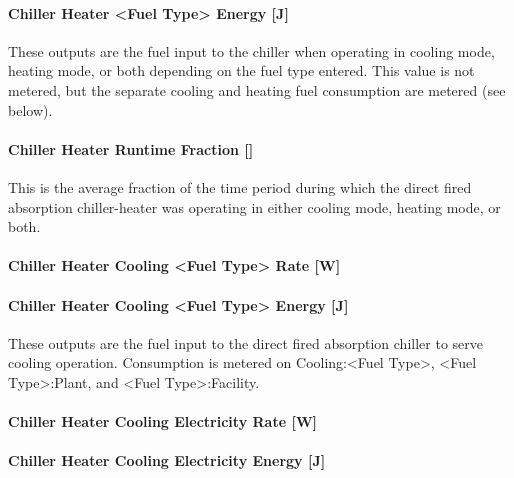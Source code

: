 \paragraph{Chiller Heater \textless{}Fuel Type\textgreater{} Energy {[}J{]}}\label{chiller-heater-fuel-type-energy-j}

These outputs are the fuel input to the chiller when operating in cooling mode, heating mode, or both depending on the fuel type entered. This value is not metered, but the separate cooling and heating fuel consumption are metered (see below).

\paragraph{Chiller Heater Runtime Fraction {[]}}\label{chiller-heater-runtime-fraction}

This is the average fraction of the time period during which the direct fired absorption chiller-heater was operating in either cooling mode, heating mode, or both.

\paragraph{Chiller Heater Cooling \textless{}Fuel Type\textgreater{} Rate {[}W{]}}\label{chiller-heater-cooling-fuel-type-rate-w}

\paragraph{Chiller Heater Cooling \textless{}Fuel Type\textgreater{} Energy {[}J{]}}\label{chiller-heater-cooling-fuel-type-energy-j}

These outputs are the fuel input to the direct fired absorption chiller to serve cooling operation. Consumption is metered on Cooling:\textless{}Fuel Type\textgreater{}, \textless{}Fuel Type\textgreater{}:Plant, and \textless{}Fuel Type\textgreater{}:Facility.

\paragraph{Chiller Heater Cooling Electricity Rate {[}W{]}}\label{chiller-heater-cooling-electric-power-w}

\paragraph{Chiller Heater Cooling Electricity Energy {[}J{]}}\label{chiller-heater-cooling-electric-energy-j}

